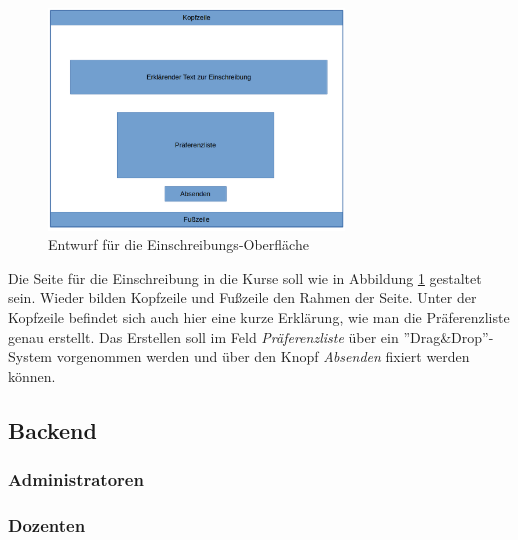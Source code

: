             \begin{figure}[t]
            	\centering
            	\includegraphics[width=0.7\textwidth]{./design/MockUpsFrontend/einschreibung.png}
            	\caption{Entwurf für die Einschreibungs-Oberfläche}
            	\label{mockupCourseChoiceFrontend}
            \end{figure}
            
            Die Seite für die Einschreibung in die Kurse soll wie in Abbildung \ref{mockupCourseChoiceFrontend} gestaltet sein.
            Wieder bilden Kopfzeile und Fußzeile den Rahmen der Seite.
            Unter der Kopfzeile befindet sich auch hier eine kurze Erklärung, wie man die Präferenzliste genau erstellt.
            Das Erstellen soll im Feld \textit{Präferenzliste} über ein ''Drag\&Drop''-System vorgenommen werden und über den Knopf \textit{Absenden} fixiert werden können.
    
        \subsection{Backend}
        	\subsubsection{Administratoren}
        	\subsubsection{Dozenten}